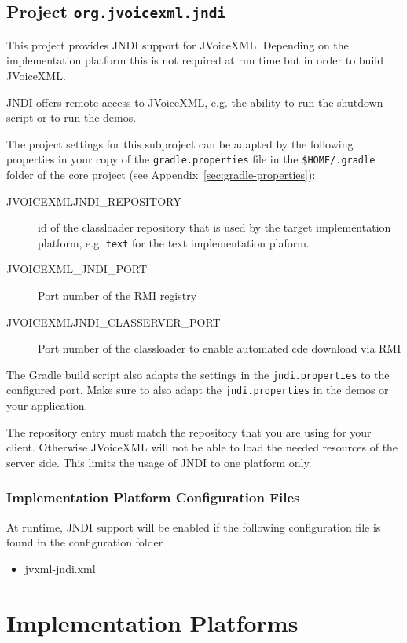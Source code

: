 \documentclass[11pt,a4paper]{article}
\begin{document}
\subsection{Project \texttt{org.jvoicexml.jndi}}
\label{sec:jndi}

This project provides JNDI support for JVoiceXML. Depending on the implementation platform this is not required at run
time but in order to build JVoiceXML.

JNDI offers remote access to JVoiceXML, e.g. the ability to run the
shutdown script or to run the demos.

The project settings for this subproject can be adapted by the following 
properties in your copy of the \texttt{gradle.properties} file in the
\texttt{\${HOME}/.gradle} folder of the core project (see 
Appendix~\ref{sec:gradle-properties}):
\begin{description}
\item[JVOICEXMLJNDI\_REPOSITORY] id of the classloader repository that is used by the target implementation platform, e.g.
\texttt{text} for the text implementation plaform. 
\item[JVOICEXML\_JNDI\_PORT] Port number of the RMI registry
\item[JVOICEXMLJNDI\_CLASSERVER\_PORT] Port number of the classloader to enable automated cde download via RMI
\end{description}

The Gradle build script also adapts the settings in the
\texttt{jndi.properties} to the configured port. Make sure to also adapt
the \texttt{jndi.properties} in the demos or your application.

The repository entry must match the repository that you are using for your
client. Otherwise JVoiceXML will not be able to load the needed resources of
the server side. This limits the usage of JNDI to one platform only.

\subsubsection{Implementation Platform Configuration Files}

At runtime, JNDI support will be enabled if the following configuration file is found in the configuration
folder
\begin{itemize}
\item jvxml-jndi.xml
\end{itemize}

\section{Implementation Platforms}
\label{sec:implementation-platforms}
\end{document}

